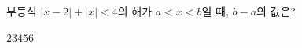 부등식 $|x-2|+|x|<4$의 해가 $a<x<b$일 때, $b-a$의 값은?
\begin{choices32}{$2$}{$3$}{$4$}{$5$}{$6$}\end{choices32}

